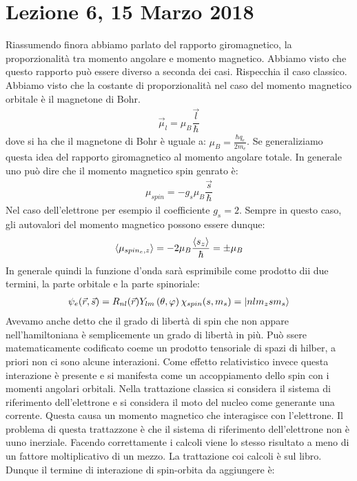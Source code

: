 \documentclass[../AppuntiStruttura]{subfiles}
\begin{document}
	\section{Lezione 6, 15 Marzo 2018}
	
	Riassumendo finora abbiamo parlato del rapporto giromagnetico, la proporzionalità tra momento angolare e momento magnetico. Abbiamo visto che questo rapporto può essere diverso a seconda dei casi. Rispecchia il caso classico. Abbiamo visto che la costante di proporzionalità nel caso del momento magnetico orbitale è il magnetone di Bohr. 
	\begin{gather*}
		\vec{\mu}_l=\mu_{B}\dfrac{\vec{l}}{\hbar}
	\end{gather*}
	dove si ha che il magnetone di Bohr è uguale a: $ \mu_{B}=\frac{\hbar q_{e}}{2m_{e}} $. Se generaliziamo questa idea del rapporto giromagnetico al momento angolare totale. In generale uno può dire che il momento magnetico spin genrato è:
	\begin{gather*}
	\mu_{spin}=-g_{s}\mu_{B}\dfrac{\vec{s}}{\hbar}
	\end{gather*}
	Nel caso dell'elettrone per esempio il coefficiente $ g_s=2 $. Sempre in questo caso, gli autovalori del momento magnetico possono essere dunque:
	\begin{gather*}                              \expval{\mu_{spin_{e},z}}=-2\mu_{B}\dfrac{\expval{s_z}}{\hbar}=\pm \mu_{B} 
	\end{gather*} 
	In generale quindi la funzione d'onda sarà esprimibile come prodotto dii due termini, la parte orbitale e la parte spinoriale:
	\begin{gather*}
	\psi_{e}(\vec{r},\vec{s})=R_{nl}(\vec{r})Y_{lm}\left(\theta,\varphi\right)\chi_{spin}(s,m_{s})=\ket{nlm_{z}sm_{s}}
	\end{gather*}
	Avevamo anche detto che il grado di libertà di spin che non appare nell'hamiltoniana è semplicemente un grado di libertà in più. Può ssere matematicamente codificato coeme un prodotto tensoriale di spazi di hilber, a priori non ci sono alcune interazioni. Come effetto relativistico invece questa interazione è presente e si manifesta come un accoppiamento dello spin con i momenti angolari orbitali. Nella trattazione classica si considera il sistema di riferimento dell'elettrone e si considera il moto del nucleo come generante una corrente. Questa causa un momento magnetico che interagisce con l'elettrone. Il problema di questa trattazzone è che il sistema di riferimento dell'elettrone non è uuno inerziale. Facendo correttamente i calcoli viene lo stesso risultato a meno di un fattore moltiplicativo di un mezzo. La trattazione coi calcoli è sul libro. Dunque il termine di interazione di spin-orbita da aggiungere è:
\end{document}
